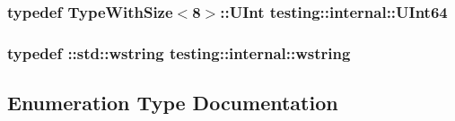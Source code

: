 \subsubsection[{\texorpdfstring{U\+Int64}{UInt64}}]{\setlength{\rightskip}{0pt plus 5cm}typedef {\bf Type\+With\+Size}$<$8$>$\+::U\+Int {\bf testing\+::internal\+::\+U\+Int64}}\hypertarget{namespacetesting_1_1internal_aa6a1ac454e6d7e550fa4925c62c35caa}{}\label{namespacetesting_1_1internal_aa6a1ac454e6d7e550fa4925c62c35caa}
\subsubsection[{\texorpdfstring{wstring}{wstring}}]{\setlength{\rightskip}{0pt plus 5cm}typedef \+::std\+::wstring {\bf testing\+::internal\+::wstring}}\hypertarget{namespacetesting_1_1internal_a3f543179329c353aee1d7b54a9a8e335}{}\label{namespacetesting_1_1internal_a3f543179329c353aee1d7b54a9a8e335}


\subsection{Enumeration Type Documentation}
